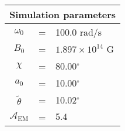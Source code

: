  \begin{tabular}{ccl}
\multicolumn{3}{c}{Simulation parameters} \\
\hline
$\omega_0$  &=& 100.0 rad/s\\
$B_0$  &=& $ 1.897\times 10^{14} $ G \\
$\chi$  &=& 80.00$^{\circ}$ \\
$a_0$ &=& 10.00$^{\circ}$ \\
$\tilde{\theta}$ &= & 10.02$^{\circ}$ \\
$\mathcal{A}_{\mathrm{EM}}$ &= & $5.4$
\end{tabular}
    
